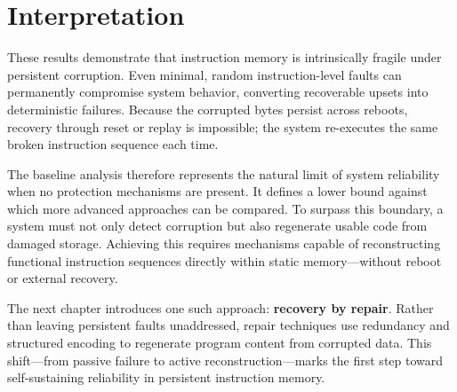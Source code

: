 \section{Interpretation}
\label{sec:limit-study-interpretation}

These results demonstrate that instruction memory is intrinsically fragile under persistent corruption.  
Even minimal, random instruction-level faults can permanently compromise system behavior, 
converting recoverable upsets into deterministic failures.  
Because the corrupted bytes persist across reboots, recovery through reset or replay is impossible; 
the system re-executes the same broken instruction sequence each time.

The baseline analysis therefore represents the natural limit of system reliability when no protection mechanisms are present.  
It defines a lower bound against which more advanced approaches can be compared.  
To surpass this boundary, a system must not only detect corruption but also regenerate usable code from damaged storage.  
Achieving this requires mechanisms capable of reconstructing functional instruction sequences directly within static memory---without reboot or external recovery.

\medskip
\noindent
The next chapter introduces one such approach: \textbf{recovery by repair}.  
Rather than leaving persistent faults unaddressed, repair techniques use redundancy and structured encoding 
to regenerate program content from corrupted data.  
This shift---from passive failure to active reconstruction---marks the first step toward self-sustaining reliability 
in persistent instruction memory.